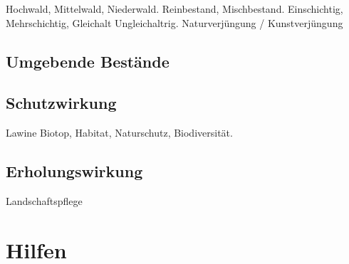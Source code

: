 \documentclass[twocolumn]{scrartcl}
\begin{document}
Hochwald, Mittelwald, Niederwald.
Reinbestand, Mischbestand.
Einschichtig, Mehrschichtig, Gleichalt Ungleichaltrig.
Naturverjüngung / Kunstverjüngung

\subsection{Umgebende Bestände}
\label{ssec:nachbarschaft}


\subsection{Schutzwirkung}
\label{ssec:schutz}

Lawine
Biotop, Habitat, Naturschutz, Biodiversität.


\subsection{Erholungswirkung}
\label{ssec:erholung}

Landschaftspflege


\section{Hilfen}
\label{sec:hilfen}





\end{document}
